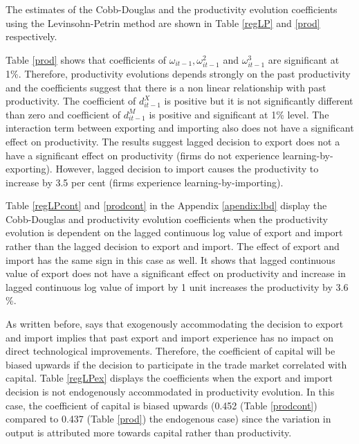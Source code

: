 \documentclass[12pt]{article}
\begin{document}
The estimates of the Cobb-Douglas and  the productivity evolution
coefficients  using the Levinsohn-Petrin
method are shown in Table \ref{regLP} and \ref{prod}  respectively. 

Table \ref{prod} shows that coefficients of $\omega_{it-1},
\omega_{it-1}^{2}$ and $\omega_{it-1}^{3}$ are significant at 1\%. Therefore, productivity evolutions depends strongly
on the past productivity and the coefficients suggest that there is a
non linear relationship with past
productivity. The coefficient of $d_{it-1}^{X}$ is positive but it is
not significantly different than zero and  coefficient of
$d_{it-1}^{M}$  is positive and significant at 1\% level. The
interaction term between exporting and importing also does not have a significant effect on productivity.
The results suggest lagged decision to export does not a have
a significant effect on productivity (firms do not experience learning-by-exporting). However, 
lagged decision to import causes the productivity to increase by 3.5  per
cent (firms experience learning-by-importing).  

 


Table \ref{regLPcont} and \ref{prodcont} in the Appendix \ref{apendix:lbd} display the Cobb-Douglas and
productivity evolution
coefficients  when the
productivity evolution is dependent on the lagged continuous log value of export
and import rather than the lagged decision to export and import.
The effect of export and import has the same sign in this case as
well. It shows that lagged
continuous value of export does not have a significant effect on
productivity and  increase in lagged continuous log value of import  by 1 unit
increases the productivity by 3.6 \%.  


As written before, \textcite{de2013detecting} says that exogenously accommodating the
decision to export and import implies that
past export and import experience has no impact on direct technological
improvements. Therefore, the coefficient of capital will be biased
upwards if the decision to participate in the trade market correlated with capital. Table
\ref{regLPex} displays the coefficients when the export and import
decision is not endogenously accommodated in 
productivity evolution. In this case, the coefficient of capital is
biased upwards (0.452 (Table \ref{prodcont}) compared to 0.437 (Table \ref{prod}) the endogenous case)  since
the variation in output is attributed more towards capital rather than productivity.   

\end{document}
